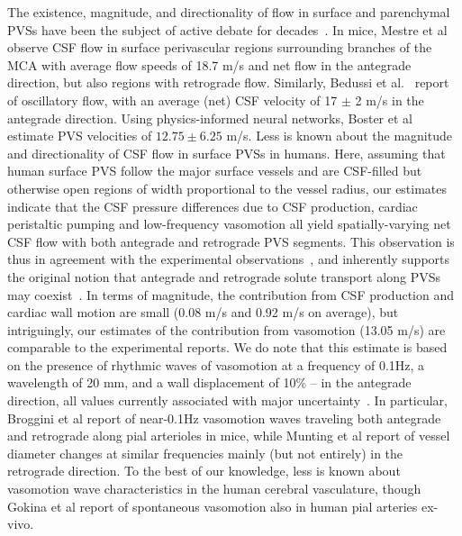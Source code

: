\documentclass[fleqn,10pt]{wlscirep}
\begin{document}
The existence, magnitude, and directionality of flow in surface and
parenchymal PVSs have been the subject of active debate for
decades~\cite{rennels1985evidence, bilston2003arterial,
  hadaczek2006perivascular, carare2008solutes, iliff2012paravascular,
  iliff2013cerebral, bakker2016lymphatic, mestre2018flow,
  bedussi2018paravascular, rey2018pulsatile, thomas2019fluid,
  daversin2020mechanisms, kedarasetti2020functional,
  martinac2021phase, vanveluw2020vasomotion, bohr2022glymphatic,
  boster2023artificial, gjerde2023directional,
  nozaleda2024arterial}. In mice, Mestre et al~\cite{mestre2018flow}
observe CSF flow in surface perivascular regions surrounding branches
of the MCA with average flow speeds of 18.7 \textmu m/s and net flow
in the antegrade direction, but also regions with retrograde
flow. Similarly, Bedussi et al.~\cite{bedussi2018paravascular} report
of oscillatory flow, with an average (net) CSF velocity of 17 $\pm$ 2
\textmu m/s in the antegrade direction. Using physics-informed neural
networks, Boster et al~\cite{boster2023artificial} estimate PVS
velocities of $12.75 \pm 6.25$ \textmu m/s. Less is known about the
magnitude and directionality of CSF flow in surface PVSs in
humans. Here, assuming that human surface PVS follow the major surface
vessels and are CSF-filled but otherwise open regions of width
proportional to the vessel radius, our estimates indicate that the CSF
pressure differences due to CSF production, cardiac peristaltic
pumping and low-frequency vasomotion all yield spatially-varying net
CSF flow with both antegrade and retrograde PVS segments. This
observation is thus in agreement with the experimental
observations~\cite{mestre2018flow, bedussi2018paravascular}, and
inherently supports the original notion that antegrade and retrograde
solute transport along PVSs may coexist~\cite{rennels1985evidence}. In
terms of magnitude, the contribution from CSF production and cardiac
wall motion are small (0.08 \textmu m/s and 0.92 \textmu m/s on
average), but intriguingly, our estimates of the contribution from
vasomotion (13.05 \textmu m/s) are comparable to the experimental
reports. We do note that this estimate is based on the presence of
rhythmic waves of vasomotion at a frequency of 0.1Hz, a wavelength of
20 mm, and a wall displacement of 10\% -- in the antegrade direction,
all values currently associated with major
uncertainty~\cite{gokina1996electrical, vanveluw2020vasomotion,
  munting2023spontaneous, broggini2024long}. In particular, Broggini
et al\cite{broggini2024long} report of near-0.1Hz vasomotion waves
traveling both antegrade and retrograde along pial arterioles in
mice, while Munting et al\cite{munting2023spontaneous} report of
vessel diameter changes at similar frequencies mainly (but not
entirely) in the retrograde direction. To the best of our knowledge,
less is known about vasomotion wave characteristics in the human
cerebral vasculature, though Gokina et al\cite{gokina1996electrical}
report of spontaneous vasomotion also in human pial arteries ex-vivo.
\end{document}

